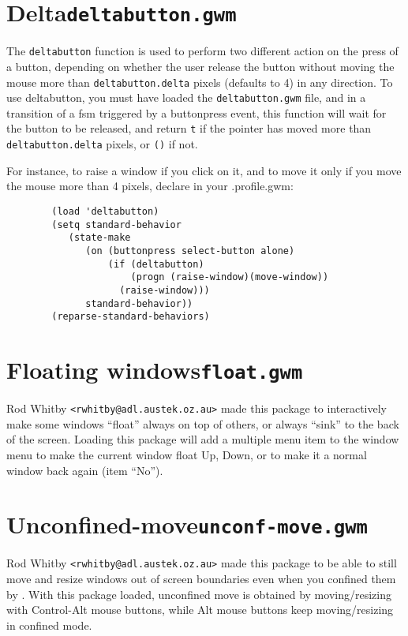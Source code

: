 \section{Delta\hfill{\tt deltabutton.gwm}}
\label{deltabutton}

The \verb|deltabutton| function is used to perform two different action on the
press of a button, depending on whether the user release the button without
moving the mouse more than \verb|deltabutton.delta| pixels (defaults to 4) in
any direction. To use deltabutton, you must have loaded the
\verb|deltabutton.gwm| file, and in a transition of a fsm triggered by a
buttonpress event, this function will wait for the button to be released, and
return \verb|t| if the pointer has moved more than \verb|deltabutton.delta|
pixels, or \verb|()| if not.

For instance, to raise a window if you click on it, and to move it only if you
move the mouse more than 4 pixels, declare in your .profile.gwm:

{\exemplefont\begin{verbatim}
        (load 'deltabutton)
        (setq standard-behavior
           (state-make
              (on (buttonpress select-button alone) 
                  (if (deltabutton)
                      (progn (raise-window)(move-window))
                    (raise-window)))
              standard-behavior))
        (reparse-standard-behaviors)
\end{verbatim}}

\section{Floating windows\hfill{\tt float.gwm}}
\label{float}

Rod Whitby \verb|<rwhitby@adl.austek.oz.au>| made this package to
interactively make some windows ``float'' always on top of others, or always
``sink'' to the back of the screen.  Loading this package will add a multiple
menu item to the window menu to make the current window float Up, Down, or to
make it a normal window back again (item ``No'').

\section{Unconfined-move\hfill{\tt unconf-move.gwm}}
\label{unconf-move}

Rod Whitby \verb|<rwhitby@adl.austek.oz.au>| made this package to
be able to still move and resize windows out of screen boundaries even when
you confined them by . With this package loaded,
unconfined move is obtained by moving/resizing with Control-Alt mouse buttons,
while Alt mouse buttons keep moving/resizing in confined mode.

